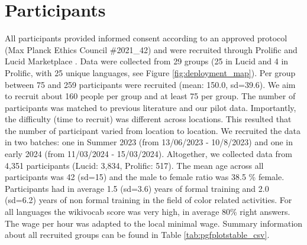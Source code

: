 \section{Participants}
\label{sec:participants}
All participants provided informed consent according to an approved protocol (Max Planck Ethics Council \#2021\_42) and were recruited through Prolific \parencite{prolific} and Lucid Marketplace \parencite{lucid}.
Data were collected from 29 groups (25 in Lucid and 4 in Prolific, with 25 unique languages, see Figure \ref{fig:deployment_map}). 
Per group between 75 and 259 participants were recruited (mean: 150.0, sd=39.6). We aim to recruit about 160 people per group and at least 75 per group. The number of participants was matched to previous literature and our pilot data. Importantly, the difficulty (time to recruit) was different across locations. This resulted that the number of participant varied from location to location. We recruited the data in two batches: one in Summer 2023 (from 13/06/2023 - 10/8/2023) and one in early 2024 (from 11/03/2024 - 15/03/2024). 
Altogether, we collected data from 4,351 participants (Lucid: 3,834, Prolific: 517).
The mean age across all participants was 42 (sd=15) and the male to female ratio was 38.5 \% female. Participants had in average 1.5 (sd=3.6) years of formal training and 2.0 (sd=6.2) years of non formal training in the field of color related activities. 
For all languages the wikivocab score was very high, in average 80\% right answers.
The wage per hour was adapted to the local minimal wage.  Summary information about all recruited groups can be found in Table \ref{tab:pgfplotstable_csv}.


\begin{table}
\centering
{}
\caption{Participants}
\label{tab:pgfplotstable_csv}
\end{table}


